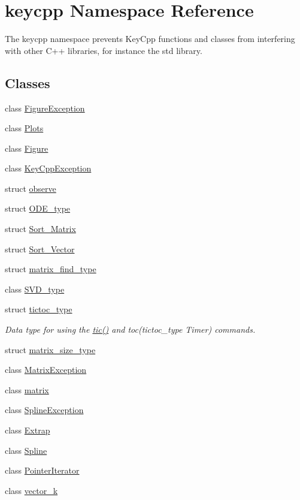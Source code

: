 \hypertarget{namespacekeycpp}{\section{keycpp Namespace Reference}
\label{namespacekeycpp}
}


The keycpp namespace prevents Key\-Cpp functions and classes from interfering with other C++ libraries, for instance the std library.  


\subsection*{Classes}
\begin{DoxyCompactItemize}
\item 
class \hyperlink{classkeycpp_1_1_figure_exception}{Figure\-Exception}
\item 
class \hyperlink{classkeycpp_1_1_plots}{Plots}
\item 
class \hyperlink{classkeycpp_1_1_figure}{Figure}
\item 
class \hyperlink{classkeycpp_1_1_key_cpp_exception}{Key\-Cpp\-Exception}
\item 
struct \hyperlink{structkeycpp_1_1observe}{observe}
\item 
struct \hyperlink{structkeycpp_1_1_o_d_e__type}{O\-D\-E\-\_\-type}
\item 
struct \hyperlink{structkeycpp_1_1_sort___matrix}{Sort\-\_\-\-Matrix}
\item 
struct \hyperlink{structkeycpp_1_1_sort___vector}{Sort\-\_\-\-Vector}
\item 
struct \hyperlink{structkeycpp_1_1matrix__find__type}{matrix\-\_\-find\-\_\-type}
\item 
class \hyperlink{classkeycpp_1_1_s_v_d__type}{S\-V\-D\-\_\-type}
\item 
struct \hyperlink{structkeycpp_1_1tictoc__type}{tictoc\-\_\-type}
\begin{DoxyCompactList}\small\item\em Data type for using the \hyperlink{namespacekeycpp_a6069a9eec0edfa1d401230013d98765e}{tic()} and toc(tictoc\-\_\-type Timer) commands. \end{DoxyCompactList}\item 
struct \hyperlink{structkeycpp_1_1matrix__size__type}{matrix\-\_\-size\-\_\-type}
\item 
class \hyperlink{classkeycpp_1_1_matrix_exception}{Matrix\-Exception}
\item 
class \hyperlink{classkeycpp_1_1matrix}{matrix}
\item 
class \hyperlink{classkeycpp_1_1_spline_exception}{Spline\-Exception}
\item 
class \hyperlink{classkeycpp_1_1_extrap}{Extrap}
\item 
class \hyperlink{classkeycpp_1_1_spline}{Spline}
\item 
class \hyperlink{classkeycpp_1_1_pointer_iterator}{Pointer\-Iterator}
\item 
class \hyperlink{classkeycpp_1_1vector__k}{vector\-\_\-k}
\end{DoxyCompactItemize}
